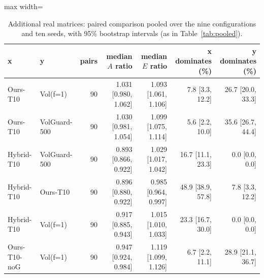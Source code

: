 \begin{table}[t]
\centering\small
\caption{Additional real matrices: paired comparison pooled over the nine configurations and ten seeds, with 95\% bootstrap intervals (as in Table~\ref{tab:pooled}).}\label{tab:realpooled}
\begin{adjustbox}{max width=\linewidth}
\begin{tabular}{llrrrrr}
\toprule
x & y & pairs & median $A$ ratio & median $E$ ratio & x dominates (\%) & y dominates (\%) \\
\midrule
Ours-T10 & Vol(f=1) & 90 & 1.031 [0.980, 1.062] & 1.093 [1.061, 1.106] & 7.8 [3.3, 12.2] & 26.7 [20.0, 33.3] \\
Ours-T10 & VolGuard-500 & 90 & 1.030 [0.981, 1.054] & 1.099 [1.075, 1.114] & 5.6 [2.2, 10.0] & 35.6 [26.7, 44.4] \\
Hybrid-T10 & VolGuard-500 & 90 & 0.893 [0.866, 0.922] & 1.029 [1.017, 1.042] & 16.7 [11.1, 23.3] & 0.0 [0.0, 0.0] \\
Hybrid-T10 & Ours-T10 & 90 & 0.896 [0.880, 0.922] & 0.985 [0.964, 0.997] & 48.9 [38.9, 57.8] & 7.8 [3.3, 12.2] \\
Hybrid-T10 & Vol(f=1) & 90 & 0.917 [0.885, 0.943] & 1.015 [1.010, 1.033] & 23.3 [16.7, 30.0] & 0.0 [0.0, 0.0] \\
Ours-T10-noG & Vol(f=1) & 90 & 0.947 [0.924, 0.984] & 1.119 [1.099, 1.126] & 6.7 [2.2, 11.1] & 28.9 [21.1, 36.7] \\
\bottomrule
\end{tabular}
\end{adjustbox}
\end{table}
